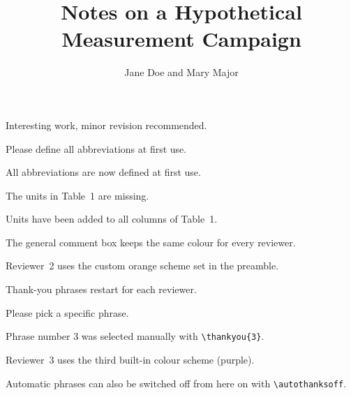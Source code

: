 \documentclass[11pt]{authorresponseletter}
\title{Notes on a Hypothetical Measurement Campaign}
\author{Jane Doe and Mary Major}
\begin{document}
\maketitle

\reviewer
\begin{generalcomment}
Interesting work, minor revision recommended.
\end{generalcomment}
\begin{generalresponse}
\end{generalresponse}

\begin{revcomment}
Please define all abbreviations at first use.
\end{revcomment}
\begin{revresponse}
All abbreviations are now defined at first use.
\end{revresponse}

\begin{revcomment}
The units in Table~1 are missing.
\end{revcomment}
\begin{revresponse}
Units have been added to all columns of Table~1.
\end{revresponse}

\reviewer
\begin{generalcomment}
The general comment box keeps the same colour for every reviewer.
\end{generalcomment}
\begin{generalresponse}
\end{generalresponse}

\begin{revcomment}
Reviewer~2 uses the custom orange scheme set in the preamble.
\end{revcomment}
\begin{revresponse}
Thank-you phrases restart for each reviewer.
\end{revresponse}

\begin{revcomment}
Please pick a specific phrase.
\end{revcomment}
\begin{revresponse}[\thankyou{3}]
Phrase number 3 was selected manually with \verb|\thankyou{3}|.
\end{revresponse}

\reviewer
\begin{revcomment}
Reviewer~3 uses the third built-in colour scheme (purple).
\end{revcomment}
\begin{revresponse}
\autothanksoff
Automatic phrases can also be switched off from here on with \verb|\autothanksoff|.
\end{revresponse}
\end{document}
